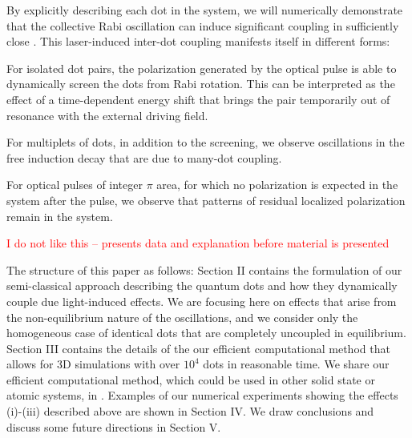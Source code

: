 By explicitly describing each dot in the system, we will numerically demonstrate  that the collective Rabi oscillation can induce significant coupling in sufficiently close \qds{}.
This laser-induced inter-dot coupling manifests itself in different forms:
\begin{inparaenum}[(i)]
  \item For isolated dot pairs, the polarization generated by the optical pulse is able to dynamically screen the dots from Rabi rotation.
  This can be interpreted as the effect of a time-dependent energy shift that brings the pair temporarily out of resonance with the external driving field.
  \item For multiplets of dots, in addition to the screening, we observe oscillations in the free induction decay that are due to many-dot coupling.
  \item For optical pulses of integer $\pi$ area, for which no polarization is expected in the system after the pulse, we observe that patterns of residual localized polarization remain in the system.
\end{inparaenum}
\textcolor{red}{I do not like this -- presents data and explanation before material is presented}

The structure of this paper as follows: Section II contains the formulation of our semi-classical approach describing the quantum dots and how they dynamically couple due light-induced effects.
We are focusing here on effects that arise from the non-equilibrium nature of the oscillations, and we consider only the homogeneous case of identical dots that are completely uncoupled in equilibrium.
Section III contains the details of the our efficient computational method that allows for 3D simulations with over $10^4$ dots in reasonable time.
We share our efficient computational method, which could be used in other solid state or atomic systems, in \cite{githubpage}.
Examples of our numerical experiments showing the effects (i)-(iii) described above are shown in Section IV.
We draw conclusions and discuss some future directions in Section V.
